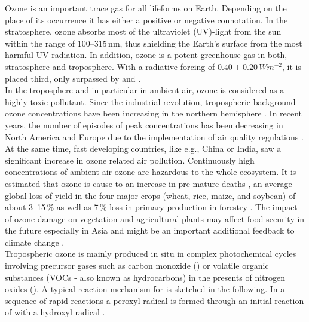 \documentclass[gmd, manuscript]{copernicus}
\begin{document}
\introduction  %
Ozone is an important trace gas for all lifeforms on Earth. Depending on the place of its occurrence it has either a positive or negative connotation. In the stratosphere, ozone absorbs most of the ultraviolet (UV)-light from the sun within the range of 100--315\,\unit{nm}, thus shielding the Earth's surface from the most harmful UV-radiation. In addition, ozone is a potent greenhouse gas in both, stratosphere and troposphere. With a radiative forcing of $0.40 \pm 0.20\,\unit{Wm^{-2}}$, it is placed third, only surpassed by  and  \citep[Chapter 8]{IPCC2013}.\\
In the troposphere and in particular in ambient air, ozone is considered as a highly toxic pollutant. Since the industrial revolution, tropospheric background ozone concentrations have been increasing in the northern hemisphere \citep[Chapter 2]{IPCC2013}. In recent years, the number of episodes of peak concentrations has been decreasing in North America and Europe due to the implementation of air quality regulations \citep[e.g.,][]{ACP:Wilson2012}. At the same time, fast developing countries, like e.g., China or India, saw a significant increase in ozone related air pollution. Continuously high concentrations of ambient air ozone are hazardous to the whole ecosystem. It is estimated that ozone is cause to an increase in pre-mature deaths \citep{WHO2008}, an average global loss of yield in the four major crops (wheat, rice, maize, and soybean) of about 3--15\,\unit{\%} \citep{PJ:Ainsworth2017} as well as 7\,\unit{\%} loss in primary production in forestry \citep{GCB:Wittig2009,EP:Matyssek2012}. The impact of ozone damage on vegetation and agricultural plants may affect food security in the future especially in Asia \citep{GCB:Tang2013,NCC:Tai2014,AE:Chuwah2015} and might be an important additional feedback to climate change \citep{Nat:Sitch2007}.\\
Tropospheric ozone is mainly produced in situ in complex photochemical cycles involving precursor gases such as carbon monoxide () or volatile organic substances (VOCs - also known as hydrocarbons) in the presents of nitrogen oxides (). A typical reaction mechanism for  is sketched in the following. In a sequence of rapid reactions a peroxyl radical  is formed through an initial reaction of  with a hydroxyl radical .
\end{document}
